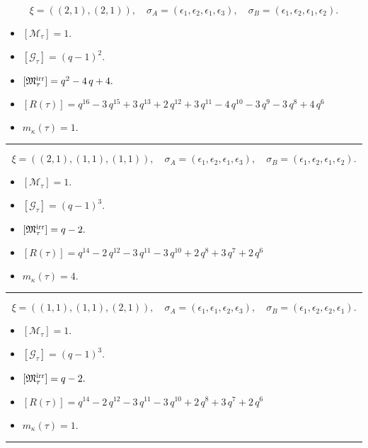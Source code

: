 \documentclass[10pt,a4paper]{amsart}
\begin{document}
$$\xi = ({(2, 1), (2, 1)}),\quad \sigma_A = ({{\epsilon_1, \epsilon_2}, {\epsilon_1, \epsilon_3}}),\quad \sigma_B = ({{\epsilon_1, \epsilon_2}, {\epsilon_1, \epsilon_2}}).$$

\begin{itemize}
 \item $[\mathcal{M}_{\tau}] = 1 .$

 \item $[\mathcal{G}_{\tau}] = {\left(q - 1\right)}^{2} .$

 \item $[{\frak M}_{\tau}^{\textrm{irr}}] = q^{2} - 4 \, q + 4 .$

 \item $[R(\tau)] = q^{16} - 3 \, q^{15} + 3 \, q^{13} + 2 \, q^{12} + 3 \, q^{11} - 4 \, q^{10} - 3 \, q^{9} - 3 \, q^{8} + 4 \, q^{6} $

 \item $m_{\kappa}(\tau) = 1 .$

 \end{itemize}
\noindent\rule{8cm}{0.4pt}

$$\xi = ({(2, 1), (1, 1), (1, 1)}),\quad \sigma_A = ({{\epsilon_1, \epsilon_2}, {\epsilon_1}, {\epsilon_3}}),\quad \sigma_B = ({{\epsilon_1, \epsilon_2}, {\epsilon_1}, {\epsilon_2}}).$$

\begin{itemize}
 \item $[\mathcal{M}_{\tau}] = 1 .$

 \item $[\mathcal{G}_{\tau}] = {\left(q - 1\right)}^{3} .$

 \item $[{\frak M}_{\tau}^{\textrm{irr}}] = q - 2 .$

 \item $[R(\tau)] = q^{14} - 2 \, q^{12} - 3 \, q^{11} - 3 \, q^{10} + 2 \, q^{8} + 3 \, q^{7} + 2 \, q^{6} $

 \item $m_{\kappa}(\tau) = 4 .$

 \end{itemize}
\noindent\rule{8cm}{0.4pt}

$$\xi = ({(1, 1), (1, 1), (2, 1)}),\quad \sigma_A = ({{\epsilon_1}, {\epsilon_1}, {\epsilon_2, \epsilon_3}}),\quad \sigma_B = ({{\epsilon_1}, {\epsilon_2}, {\epsilon_2, \epsilon_1}}).$$

\begin{itemize}
 \item $[\mathcal{M}_{\tau}] = 1 .$

 \item $[\mathcal{G}_{\tau}] = {\left(q - 1\right)}^{3} .$

 \item $[{\frak M}_{\tau}^{\textrm{irr}}] = q - 2 .$

 \item $[R(\tau)] = q^{14} - 2 \, q^{12} - 3 \, q^{11} - 3 \, q^{10} + 2 \, q^{8} + 3 \, q^{7} + 2 \, q^{6} $

 \item $m_{\kappa}(\tau) = 1 .$

 \end{itemize}
\noindent\rule{8cm}{0.4pt}
\end{document}
